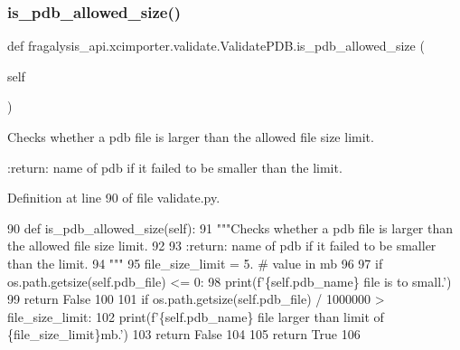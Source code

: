 \subsubsection{\texorpdfstring{is\+\_\+pdb\+\_\+allowed\+\_\+size()}{is\_pdb\_allowed\_size()}}
{\footnotesize\ttfamily def fragalysis\+\_\+api.\+xcimporter.\+validate.\+Validate\+P\+D\+B.\+is\+\_\+pdb\+\_\+allowed\+\_\+size (\begin{DoxyParamCaption}\item[{}]{self }\end{DoxyParamCaption})}

\begin{DoxyVerb}Checks whether a pdb file is larger than the allowed file size limit.

:return: name of pdb if it failed to be smaller than the limit.
\end{DoxyVerb}
 

Definition at line 90 of file validate.\+py.


\begin{DoxyCode}
90     \textcolor{keyword}{def }is\_pdb\_allowed\_size(self):
91         \textcolor{stringliteral}{"""Checks whether a pdb file is larger than the allowed file size limit.}
92 \textcolor{stringliteral}{}
93 \textcolor{stringliteral}{        :return: name of pdb if it failed to be smaller than the limit.}
94 \textcolor{stringliteral}{        """}
95         file\_size\_limit = 5.  \textcolor{comment}{# value in mb}
96 
97         \textcolor{keywordflow}{if} os.path.getsize(self.pdb\_file) <= 0:
98             print(f\textcolor{stringliteral}{'\{self.pdb\_name\} file is to small.'})
99             \textcolor{keywordflow}{return} \textcolor{keyword}{False}
100 
101         \textcolor{keywordflow}{if} os.path.getsize(self.pdb\_file) / 1000000 > file\_size\_limit:
102             print(f\textcolor{stringliteral}{'\{self.pdb\_name\} file larger than limit of \{file\_size\_limit\}mb.'})
103             \textcolor{keywordflow}{return} \textcolor{keyword}{False}
104 
105         \textcolor{keywordflow}{return} \textcolor{keyword}{True}
106 
\end{DoxyCode}
\mbox{\label{classfragalysis__api_1_1xcimporter_1_1validate_1_1_validate_p_d_b_a23b89548ce5a6619636348c711b7b27e}} 

